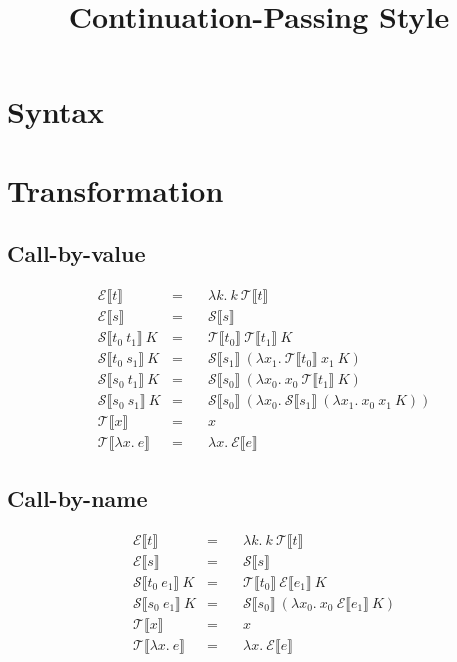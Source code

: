 
\usepackage{graphicx}
\usepackage{mdframed}
\usepackage{stmaryrd}

\newcommand\fun\lambda
\newcommand{\K}[1]{\llbracket #1\rrbracket}
\newcommand{\EK}[1]{\mathcal E\K{#1}}
\newcommand{\SK}[1]{\mathcal S\K{#1}}
\newcommand{\TK}[1]{\mathcal T\K{#1}}
\newcommand{\Edef}[2]{&\EK{#1}&=\quad&#2}
\newcommand{\sdef}[2]{&\SK{#1}~K&=\quad&#2}
\newcommand{\tdef}[2]{&\TK{#1}&=\quad&#2}

\title{Continuation-Passing Style}
\date{}


\maketitle

\section*{Syntax}
\begin{figure}[h]
\begin{mdframed}
\ottmetavars

\ottgrammar
\end{mdframed}
\end{figure}

\section*{Transformation}
\subsection*{Call-by-value}
\begin{align*}
\Edef{t}{\fun k.~k~\TK{t}}\\
\Edef{s}{\SK{s}}\\
\sdef{t_0~t_1}{\TK{t_0}~\TK{t_1}~K}\\
\sdef{t_0~s_1}{\SK{s_1}~(\fun x_1.~\TK{t_0}~x_1~K)}\\
\sdef{s_0~t_1}{\SK{s_0}~(\fun x_0.~x_0~\TK{t_1}~K)}\\
\sdef{s_0~s_1}{\SK{s_0}~(\fun x_0.~\SK{s_1}~(\fun x_1.~x_0~x_1~K))}\\
\tdef{x}{x}\\
\tdef{\fun x.~e}{\fun x.~\EK{e}}
\end{align*}

\subsection*{Call-by-name}
\begin{align*}
\Edef{t}{\fun k.~k~\TK{t}}\\
\Edef{s}{\SK{s}}\\
\sdef{t_0~e_1}{\TK{t_0}~\EK{e_1}~K}\\
\sdef{s_0~e_1}{\SK{s_0}~(\fun x_0.~x_0~\EK{e_1}~K)}\\
\tdef{x}{x}\\
\tdef{\fun x.~e}{\fun x.~\EK{e}}
\end{align*}

